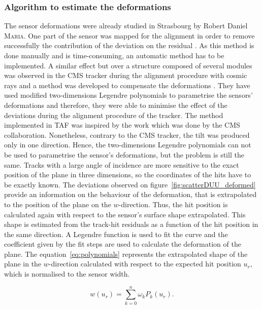       \subsubsection{Algorithm to estimate the deformations}

      The sensor deformations were already studied in Strasbourg by Robert Daniel \textsc{Maria}.
      One part of the sensor was mapped for the alignment in order to remove successfully the contribution of the deviation on the residual \cite{maria}.
      As this method is done manually and is time-consuming, an automatic method has to be implemented.
      A similar effect but over a structure composed of several modules was observed in the CMS tracker during the alignment procedure with cosmic rays and a method was developed to compensate the deformations \cite{CMSalignment}. 
      They have used modified two-dimensions Legendre polynomials to parametrise the sensors' deformations and therefore, they were able to minimise the effect of the deviations during the alignment procedure of the tracker.
      The method implemented in \gls{TAF} was inspired by the work which was done by the CMS collaboration.
      Nonetheless, contrary to the CMS tracker, the tilt was produced only in one direction.
      Hence, the two-dimensions Legendre polynomials can not be used to parametrise the sensor's deformations, but the problem is still the same.
      Tracks with a large angle of incidence are more sensitive to the exact position of the plane in three dimensions, so the coordinates of the hits have to be exactly known.
      The deviations observed on figure~\ref{fig:scatterDUU_deformed} provide an information on the behaviour of the deformation, that is extrapolated to the position of the plane on the $w$-direction.
      Thus, the hit position is calculated again with respect to the sensor's surface shape extrapolated.
      This shape is estimated from the track-hit residuals as a function of the hit position in the same direction.
      A Legendre function is used to fit the curve and the coefficient given by the fit steps are used to calculate the deformation of the plane.
      The equation~\ref{eq:polynomials} represents the extrapolated shape of the plane in the $w$-direction calculated with respect to the expected hit position $u_{r}$, which is normalised to the sensor width.

      \begin{equation}
        w\left(u_{r}\right) = \sum_{k=0}^n \omega_{k}P_{k}\left(u_{r}\right).
        \label{eq:polynomials}
      \end{equation}
      
